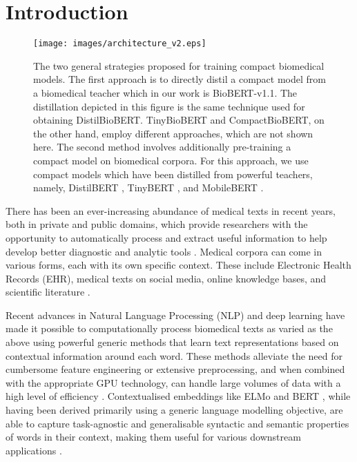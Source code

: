 \documentclass{article}
\begin{document}
\section{Introduction}
\label{intro}

\begin{figure*}[ht!]
\centering
\texttt{[image: images/architecture\_v2.eps]}
\caption{The two general strategies proposed for training compact biomedical models. The first approach is to directly distil a compact model from a biomedical teacher which in our work is BioBERT-v1.1. The distillation depicted in this figure is the same technique used for obtaining DistilBioBERT. TinyBioBERT and CompactBioBERT, on the other hand, employ different approaches, which are not shown here. The second method involves additionally pre-training a compact model on biomedical corpora. For this approach, we use compact models which have been distilled from powerful teachers, namely, DistilBERT \citep{sanh2019distilbert}, TinyBERT \citep{jiao-etal-2020-tinybert}, and MobileBERT \citep{sun-etal-2020-mobilebert}.}
\label{fig:architecture}
\end{figure*}


There has been an ever-increasing abundance of medical texts in recent years, both in private and public domains, which provide researchers with the opportunity to automatically process and extract useful information to help develop better diagnostic and analytic tools \citep{locke2021natural}. Medical corpora can come in various forms, each with its own specific context. These include Electronic Health Records (EHR), medical texts on social media, online knowledge bases, and scientific literature \citep{KALYAN2020103323}. 

Recent advances in Natural Language Processing (NLP) and deep learning have made it possible to computationally process biomedical texts as varied as the above using powerful generic methods that learn text representations based on contextual information around each word. These methods alleviate the need for cumbersome feature engineering or extensive preprocessing, and when combined with the appropriate GPU technology, can handle large volumes of data with a high level of efficiency \citep{wu2020deep}. Contextualised embeddings like ELMo \citep{peters-etal-2018-deep} and BERT \citep{devlin-etal-2019-bert}, while having been derived primarily using a generic language modelling objective, are able to capture task-agnostic and generalisable syntactic and semantic properties of words in their context, making them useful for various downstream applications \citep{ethayarajh2019contextual, tenney2019you}.    
\end{document}

